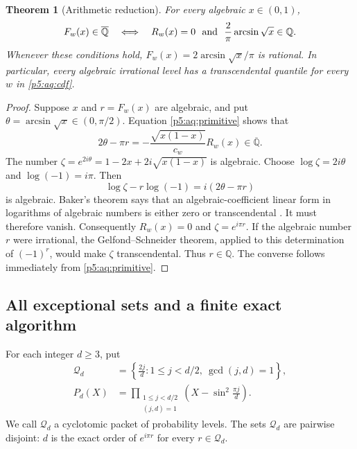 \documentclass[11pt,a4paper]{article}
\newtheorem{theorem}{Theorem}[section]
\theoremstyle{definition}
\theoremstyle{remark}
\numberwithin{equation}{section}
\begin{document}
\begin{theorem}[Arithmetic reduction]\label{p5:aq:arithmetic}
For every algebraic $x\in(0,1)$,
\begin{equation}\label{p5:aq:arithmetic-iff}
 F_w(x)\in\overline{\mathbb Q}
 \quad\Longleftrightarrow\quad
 R_w(x)=0\ \hbox{ and }\
 \frac{2}{\pi}\arcsin\sqrt{x}\in\mathbb Q.
\end{equation}
Whenever these conditions hold,
$F_w(x)=2\arcsin\sqrt{x}/\pi$ is rational.
In particular, every algebraic irrational level has a
transcendental quantile for every $w$ in \eqref{p5:aq:cdf}.
\end{theorem}

\begin{proof}
Suppose $x$ and $r=F_w(x)$ are algebraic, and put
$\theta=\arcsin\sqrt{x}\in(0,\pi/2)$.
Equation \eqref{p5:aq:primitive} shows that
\[
 2\theta-\pi r
       =-\frac{\sqrt{x(1-x)}}{c_w}R_w(x)
       \in\overline{\mathbb Q}.
\]
The number
$\zeta=e^{2i\theta}=1-2x+2i\sqrt{x(1-x)}$ is algebraic.
Choose $\log\zeta=2i\theta$ and $\log(-1)=i\pi$.
Then
\[
 \log\zeta-r\log(-1)=i(2\theta-\pi r)
\]
is algebraic. Baker's theorem says that an algebraic-coefficient
linear form in logarithms of algebraic numbers is either zero or
transcendental \cite{p5:aq:BakerIII}. It must therefore vanish.
Consequently $R_w(x)=0$ and $\zeta=e^{i\pi r}$.
If the algebraic number $r$ were irrational, the
Gelfond--Schneider theorem, applied to this determination of
$(-1)^r$, would make $\zeta$ transcendental. Thus $r\in\mathbb Q$.
The converse follows immediately from \eqref{p5:aq:primitive}.
\end{proof}

\subsection{All exceptional sets and a finite exact algorithm}

For each integer $d\ge3$, put
\begin{align}
 \mathcal Q_d
  &=\left\{\frac{2j}{d}:1\le j<d/2,\ \gcd(j,d)=1\right\},
       \label{p5:aq:packets}\\
 P_d(X)
  &=\prod_{\substack{1\le j<d/2\\(j,d)=1}}
       \left(X-\sin^2\frac{\pi j}{d}\right).
       \label{p5:aq:cyclotomic-polynomial}
\end{align}
We call $\mathcal Q_d$ a cyclotomic packet of probability levels.
The sets $\mathcal Q_d$ are pairwise disjoint: $d$ is the exact
order of $e^{i\pi r}$ for every $r\in\mathcal Q_d$.
\end{document}
